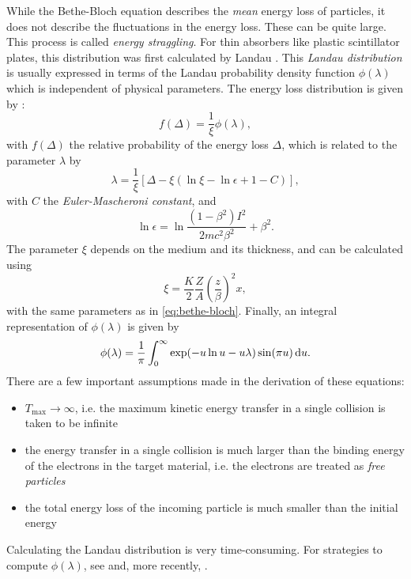 \label{pg:landau}
While the Bethe-Bloch equation describes the \emph{mean} energy loss of
particles, it does not describe the fluctuations in the energy loss.  These can
be quite large.  This process is called \emph{energy straggling}.  For thin
absorbers like plastic scintillator plates, this distribution was first
calculated by Landau \cite{Landau:1944}. This \emph{Landau distribution} is
usually expressed in terms of the Landau probability density function
$\phi(\lambda)$ which is independent of physical parameters. The energy loss
distribution is given by \cite{Leo:1994}:
\begin{equation}
f(\Delta) = \frac{1}{\xi}\phi(\lambda),
\end{equation}
with $f(\Delta)$ the relative probability of the energy loss $\Delta$, which is
related to the parameter $\lambda$ by
\begin{equation}
\lambda = \frac{1}{\xi}\left[\Delta - \xi(\ln\xi - \ln\epsilon + 1 - C)\right],
\end{equation}
with $C$ the \emph{Euler-Mascheroni constant}, and
\begin{equation}
\ln\epsilon = \ln\frac{(1 - \beta^2)I^2}{2mc^2\beta^2} + \beta^2.
\end{equation}
The parameter $\xi$ depends on the medium and its thickness, and can be
calculated using
\begin{equation}
\xi = \frac{K}{2} \frac{Z}{A} \left(\frac{z}{\beta}\right)^{\!2} x,
\end{equation}
with the same parameters as in \eqref{eq:bethe-bloch}.  Finally, an integral
representation of $\phi(\lambda)$ is given by
\begin{equation}
\phi(\lambda) = \frac{1}{\pi} \int_0^\infty \exp(-u \ln u - u\lambda) \sin (\pi u)
\,\mathrm{d} u.
\label{eq:landau-integral}
\end{equation}
%
There are a few important assumptions made in the derivation of these equations:
\begin{itemize}
    \item $T_\mathrm{max} \to \infty$, i.e. the maximum kinetic energy transfer
    in a single collision is taken to be infinite
    \item the energy transfer in a single collision is much larger than the
    binding energy of the electrons in the target material, i.e. the electrons
    are treated as \emph{free particles}
    \item the total energy loss of the incoming particle is much smaller than
    the initial energy
\end{itemize}
%
Calculating the Landau distribution is very time-consuming.  For strategies to
compute $\phi(\lambda)$, see \cite{Kolbig:1984} and, more recently,
\cite{Marucho:2006}.


